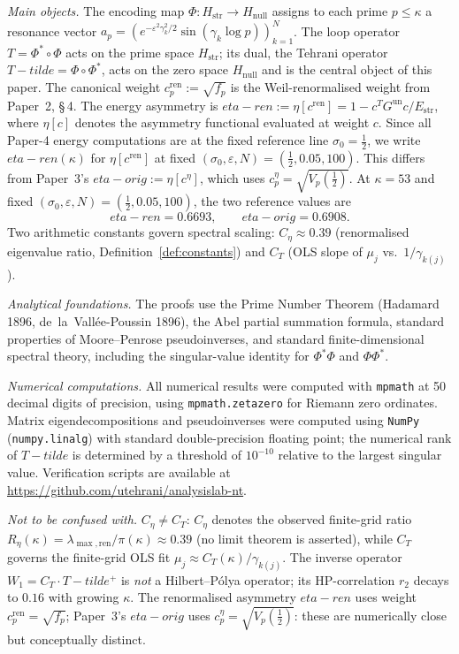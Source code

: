 \documentclass[11pt]{article}
\def\Tt{T-tilde}%
\def\etaren{eta-ren}%
\def\etaorig{eta-orig}%
\newcommand{\Hstr}{H_{\mathrm{str}}}
\newcommand{\Hnull}{H_{\mathrm{null}}}
\newcommand{\Estr}{E_{\mathrm{str}}}
\newcommand{\etaorig}{\eta_{\mathrm{orig}}}
\newcommand{\etaren}{\eta_{\mathrm{ren}}}
\newcommand{\Gun}{G^{\mathrm{un}}}
\newcommand{\Tt}{\widetilde{T}}
\newcommand{\Ceta}{C_{\eta}}
\newcommand{\CT}{C_{T}}
\begin{document}
\medskip
\emph{Main objects.}
The encoding map $\Phi\colon\Hstr\to\Hnull$
assigns to each prime $p\leq\kappa$ a resonance vector
$a_p=(e^{-\varepsilon^2\gamma_k^2/2}\sin(\gamma_k\log p))_{k=1}^N$.
The loop operator $T=\Phi^*\!\circ\Phi$ acts on the prime
space $\Hstr$; its dual, the Tehrani operator
$\Tt=\Phi\circ\Phi^*$, acts on the zero space $\Hnull$
and is the central object of this paper.
The canonical weight $c_p^{\mathrm{ren}}:=\sqrt{f_p}$ is the
Weil-renormalised weight from Paper~2, \S\,4.
The energy asymmetry is
$\etaren := \eta[c^{\mathrm{ren}}] = 1-c^T\Gun c/\Estr$,
where $\eta[c]$ denotes the asymmetry functional evaluated at weight $c$.
Since all Paper-4 energy computations are at the fixed reference line
$\sigma_0=\tfrac12$, we write $\etaren(\kappa)$ for $\eta[c^{\mathrm{ren}}]$
at fixed $(\sigma_0,\varepsilon,N)=(\tfrac12,0.05,100)$.
This differs from Paper~3's $\etaorig := \eta[c^{\eta}]$, which uses
$c_p^{\eta}=\sqrt{V_p(\tfrac12)}$. At $\kappa=53$ and fixed
$(\sigma_0,\varepsilon,N)=(\tfrac12,0.05,100)$, the two reference values are
\[
\etaren=0.6693,\qquad \etaorig=0.6908.
\]
Two arithmetic constants govern spectral scaling:
$\Ceta\approx 0.39$ (renormalised eigenvalue ratio, Definition~\ref{def:constants}) and
$\CT$ (OLS slope of $\mu_j$ vs.\ $1/\gamma_{k(j)}$).

\medskip
\emph{Analytical foundations.}
The proofs use the Prime Number Theorem
(Hadamard 1896, de~la~Vall\'ee-Poussin 1896),
the Abel partial summation formula, standard properties of
Moore--Penrose pseudoinverses, and standard
finite-dimensional spectral theory, including the
singular-value identity for $\Phi^*\Phi$ and $\Phi\Phi^*$.

\medskip
\emph{Numerical computations.}
All numerical results were computed with \texttt{mpmath} at
50 decimal digits of precision, using \texttt{mpmath.zetazero}
for Riemann zero ordinates.
Matrix eigendecompositions and pseudoinverses were computed using
\texttt{NumPy} (\texttt{numpy.linalg}) with standard double-precision
floating point; the numerical rank of $\Tt$ is determined by a
threshold of $10^{-10}$ relative to the largest singular value.
Verification scripts are available at
\url{https://github.com/utehrani/analysislab-nt}.

\medskip
\emph{Not to be confused with.}
$\Ceta\neq\CT$: $\Ceta$ denotes the observed finite-grid ratio
$R_\eta(\kappa)=\lambda_{\max,\mathrm{ren}}/\pi(\kappa)\approx 0.39$
(no limit theorem is asserted), while $\CT$ governs the finite-grid
OLS fit $\mu_j\approx\CT(\kappa)/\gamma_{k(j)}$.
The inverse operator $W_1=\CT\cdot\Tt^+$ is \emph{not}
a Hilbert--P\'olya operator; its HP-correlation $r_2$
decays to $0.16$ with growing $\kappa$.
The renormalised asymmetry $\etaren$ uses weight $c_p^{\mathrm{ren}}=\sqrt{f_p}$;
Paper~3's $\etaorig$ uses $c_p^{\eta}=\sqrt{V_p(\tfrac12)}$:
these are numerically close but conceptually distinct.
\end{document}

